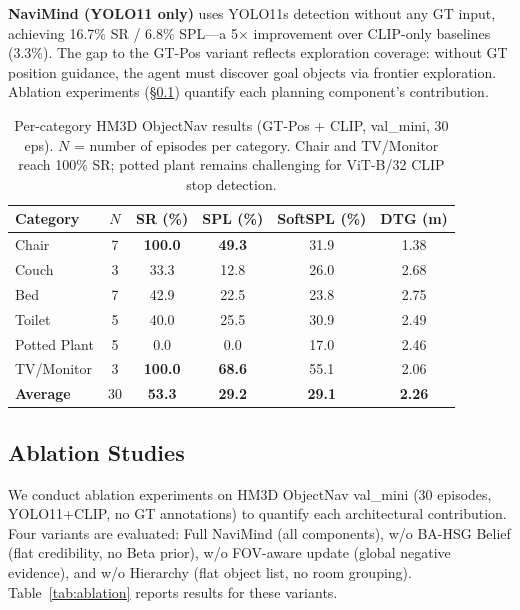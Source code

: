 \documentclass[conference]{IEEEtran}
\begin{document}
\textbf{NaviMind (YOLO11 only)} uses YOLO11s detection without any GT input, achieving 16.7\% SR / 6.8\% SPL---a 5$\times$ improvement over CLIP-only baselines (3.3\%).
The gap to the GT-Pos variant reflects exploration coverage: without GT position guidance, the agent must discover goal objects via frontier exploration.
Ablation experiments (\S\ref{sec:ablation}) quantify each planning component's contribution.

\begin{table}[t]
\centering
\caption{Per-category HM3D ObjectNav results (GT-Pos + CLIP, val\_mini, 30 eps).
$N$ = number of episodes per category.
Chair and TV/Monitor reach 100\% SR; potted plant remains challenging for ViT-B/32 CLIP stop detection.}
\label{tab:hm3d_per_category}
\footnotesize
\begin{tabular}{@{}lccccc@{}}
\toprule
Category & $N$ & SR (\%) & SPL (\%) & SoftSPL (\%) & DTG (m) \\
\midrule
Chair        & 7 & \textbf{100.0} & \textbf{49.3} & 31.9 & 1.38 \\
Couch        & 3 &  33.3 & 12.8 & 26.0 & 2.68 \\
Bed          & 7 &  42.9 & 22.5 & 23.8 & 2.75 \\
Toilet       & 5 &  40.0 & 25.5 & 30.9 & 2.49 \\
Potted Plant & 5 &   0.0 &  0.0 & 17.0 & 2.46 \\
TV/Monitor   & 3 & \textbf{100.0} & \textbf{68.6} & 55.1 & 2.06 \\
\midrule
\textbf{Average} & 30 & \textbf{53.3} & \textbf{29.2} & \textbf{29.1} & \textbf{2.26} \\
\bottomrule
\end{tabular}
\vspace{-2mm}
\end{table}

\subsection{Ablation Studies}
\label{sec:ablation}

We conduct ablation experiments on HM3D ObjectNav val\_mini (30 episodes, YOLO11+CLIP, no GT annotations) to quantify each architectural contribution.
Four variants are evaluated: Full NaviMind (all components), w/o BA-HSG Belief (flat credibility, no Beta prior), w/o FOV-aware update (global negative evidence), and w/o Hierarchy (flat object list, no room grouping).
Table~\ref{tab:ablation} reports results for these variants.
\end{document}
